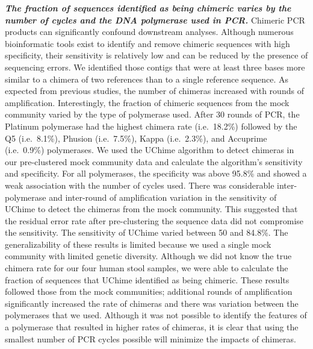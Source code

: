 \documentclass[11pt,]{article}
\begin{document}
\textbf{\emph{The fraction of sequences identified as being chimeric
varies by the number of cycles and the DNA polymerase used in PCR.}}
Chimeric PCR products can significantly confound downstream analyses.
Although numerous bioinformatic tools exist to identify and remove
chimeric sequences with high specificity, their sensitivity is
relatively low and can be reduced by the presence of sequencing errors.
We identified those contigs that were at least three bases more similar
to a chimera of two references than to a single reference sequence. As
expected from previous studies, the number of chimeras increased with
rounds of amplification. Interestingly, the fraction of chimeric
sequences from the mock community varied by the type of polymerase used.
After 30 rounds of PCR, the Platinum polymerase had the highest chimera
rate (i.e.~18.2\%) followed by the Q5 (i.e.~8.1\%), Phusion
(i.e.~7.5\%), Kappa (i.e.~2.3\%), and Accuprime (i.e.~0.9\%)
polymerases. We used the UChime algorithm to detect chimeras in our
pre-clustered mock community data and calculate the algorithm's
sensitivity and specificity. For all polymerases, the specificity was
above 95.8\% and showed a weak association with the number of cycles
used. There was considerable inter-polymerase and inter-round of
amplification variation in the sensitivity of UChime to detect the
chimeras from the mock community. This suggested that the residual error
rate after pre-clustering the sequence data did not compromise the
sensitivity. The sensitivity of UChime varied between 50 and 84.8\%. The
generalizability of these results is limited because we used a single
mock community with limited genetic diversity. Although we did not know
the true chimera rate for our four human stool samples, we were able to
calculate the fraction of sequences that UChime identified as being
chimeric. These results followed those from the mock communities;
additional rounds of amplification significantly increased the rate of
chimeras and there was variation between the polymerases that we used.
Although it was not possible to identify the features of a polymerase
that resulted in higher rates of chimeras, it is clear that using the
smallest number of PCR cycles possible will minimize the impacts of
chimeras.
\end{document}
